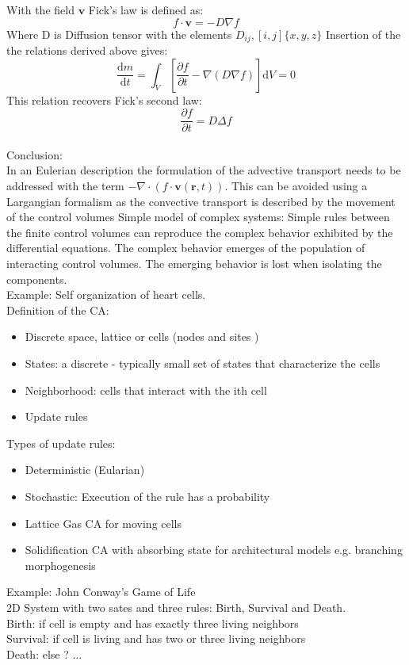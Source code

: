 \documentclass[hyperref]{labbook}
\numberwithin{equation}{experiment}
\numberwithin{table}{experiment}
\numberwithin{figure}{experiment}
\begin{document}
With the  field $\mathbf{v}$ Fick's law is defined as:
\begin{equation}
f \cdot \mathbf{v} = -{D} \nabla f
\end{equation}
Where D is Diffusion tensor with the elements $D_{ij} ,[i,j]  \{x,y,z\}$
Insertion of the the relations derived above gives: 
\begin{equation}
\frac{\mathrm{d}m}{\mathrm{d}t}  = \int_V \left[ \frac{\partial f }{\partial t } - \nabla (D\nabla f) \right]\mathrm{d}V = 0
\end{equation}
This relation recovers Fick's second law:
\begin{equation}
\frac{\partial f}{\partial t} = D \Delta f
\end{equation}\\[1em]
Conclusion: \\
In an Eulerian description the formulation of the advective transport needs to be addressed with the term $ - \nabla \cdot (f \cdot \mathbf{v}(\mathbf{r},t))$. This can be avoided using a Largangian formalism as the convective transport is described by the movement of the control volumes  
Simple model of complex systems: Simple rules between the finite control volumes can reproduce the complex behavior exhibited by the differential equations. The complex behavior emerges of the population of interacting control volumes. The emerging behavior is lost when isolating the components. \\[1em]
Example: Self organization of heart cells. \\[1em]
Definition of the CA: 
\begin{itemize}
\item Discrete space, lattice or cells (nodes and sites ) 
\item States: a discrete - typically small set of states that characterize the cells 
\item Neighborhood: cells that interact with the ith cell  
\item Update rules 
\end{itemize}
Types of update rules: 
\begin{itemize}
\item Deterministic (Eularian) 
\item Stochastic: Execution of the rule has a probability  
\item Lattice Gas CA for moving cells 
\item Solidification CA with absorbing state for architectural models e.g. branching morphogenesis
\end{itemize}
Example: John Conway's Game of Life\\
2D System with two sates and three rules: Birth, Survival and Death. \\
Birth: if cell is empty and has exactly three living neighbors  \\
Survival: if cell is living and has two or three living neighbors \\
Death: else ?    ... 
\end{document}
